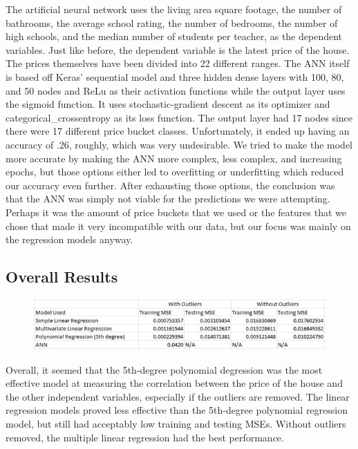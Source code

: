 \documentclass[a4paper]{article}
\begin{document}
	The artificial neural network uses the living area square footage, the number of bathrooms, the average school rating, the number of bedrooms, the number of high schools, and the median number of students per teacher, as the dependent variables. Just like before, the dependent variable is the latest price of the house. The prices themselves have been divided into 22 different ranges. The ANN itself is based off Keras' sequential model and three hidden dense layers with 100, 80, and 50 nodes and ReLu as their activation functions while the output layer uses the sigmoid function. It uses stochastic-gradient descent as its optimizer and categorical\_crossentropy as its loss function. The output layer had 17 nodes since there were 17 different price bucket classes. Unfortunately, it ended up having an accuracy of .26, roughly, which was very undesirable. We tried to make the model more accurate by making the ANN more complex, less complex, and increasing epochs, but those options either led to overfitting or underfitting which reduced our accuracy even further. After exhausting those options, the conclusion was that the ANN was simply not viable for the predictions we were attempting. Perhaps it was the amount of price buckets that we used or the features that we chose that made it very incompatible with our data, but our focus was mainly on the regression models anyway.
	
	\subsection{Overall Results}
	
	\begin{figure}[H]
		\label{fig:fig5}
		\includegraphics[width=1\linewidth]{fig5}
	\end{figure}

	Overall, it seemed that the 5th-degree polynomial degression was the most effective model at measuring the correlation between the price of the house and the other independent variables, especially if the outliers are removed. The linear regression models proved less effective than the 5th-degree polynomial regression model, but still had acceptably low training and testing MSEs. Without outliers removed, the multiple linear regression had the best performance.
	
\end{document}
